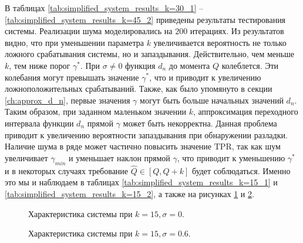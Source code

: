 \documentclass[specialist, substylefile = spbu.rtx,
			   subf, href, 12pt]{disser}
\begin{document}
В таблицах \ref{tab:simplified_system_results_k=30_1} -- \ref{tab:simplified_system_results_k=45_2} приведены результаты тестирования системы. Реализации шума моделировались на $ 200 $ итерациях. Из результатов видно, что при уменьшении параметра $ k $ увеличивается вероятность не только ложного срабатывания системы, но и запаздывания. Действительно, чем меньше $ k $, тем ниже порог $ \gamma^* $. При $ \sigma \neq 0 $ функция $ d_n $ до момента $ Q $ колеблется. Эти колебания могут превышать значение $ \gamma^* $, что и приводит к увеличению ложноположительных срабатываний. Также, как было упомянуто в секции \ref{ch:approx_d_n}, первые значения $ \gamma $ могут быть больше начальных значений $ d_n $. Таким образом, при заданном маленьком значении $ k $, аппроксимация переходного интервала функции $ d_n $ прямой $ \gamma $ может быть некорректна. Данная проблема приводит к увеличению вероятности запаздывания при обнаружении разладки. Наличие шума в ряде может частично повысить значение $ \mathrm{TPR} $, так как шум увеличивает $ \gamma_{min} $ и уменьшает наклон прямой $ \gamma $, что приводит к уменьшению $ \gamma^* $ и в некоторых случаях требование $ \hat{Q} \in [Q, Q+k] $ будет соблюдаться. Именно это мы и наблюдаем в таблицах \ref{tab:simplified_system_results_k=15_1} и \ref{tab:simplified_system_results_k=15_2}, а также на рисунках \ref{pic:system_estimation_small_k} и \ref{pic:system_estimation_small_k_noise}. 

\begin{figure}[!hhh]
	\caption{Характеристика системы при $ k=15, \sigma=0 $.}
	\label{pic:system_estimation_small_k}
\end{figure}


\begin{figure}[!hhh]
	\caption{Характеристика системы при $ k=15, \sigma=0.6 $.}
	\label{pic:system_estimation_small_k_noise}
\end{figure}
\end{document}

